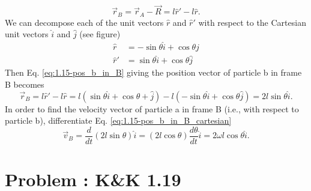 \documentclass[solutions]{esg8012pset}
\begin{document}
\begin{enumerate}[a.]
      \begin{equation} \vec r_B = \vec r_A - \vec R = l\hat r' - l\hat r. \label{eq:1.15-pos_b_in_B} \end{equation}
      We can decompose each of the unit vectors $\hat r$ and $\hat r'$ with respect to the Cartesian unit vectors $\hat i$ and $\hat j$ (see figure)
      \begin{align}
        \hat r & = -\sin\theta \hat i + \cos\theta \hat j \label{eq:1.15-cartesian_r_hat} \\
        \hat r' & = \sin\theta \hat i + \cos\theta \hat j \label{eq:1.15-cartesian_r_hat'}
      \end{align}
      Then Eq. \ref{eq:1.15-pos_b_in_B} giving the position vector of particle b in frame B becomes
      \begin{equation}
        \vec r_B = l\hat r' - l\hat r = l(\sin\theta \hat i + \cos\theta + \hat j) - l(-\sin\theta \hat i + \cos\theta \hat j) = 2l\sin\theta \hat i. \label{eq:1.15-pos_b_in_B_cartesian}
      \end{equation}
      In order to find the velocity vector of particle a in frame B (i.e., with respect to particle b), differentiate Eq. \ref{eq:1.15-pos_b_in_B_cartesian}
      \begin{equation}
        \vec v_B = \frac{d}{dt}(2l\sin\theta) \hat i = (2l\cos\theta)\frac{d\theta}{dt}\hat i = 2\omega l \cos\theta \hat i.
      \end{equation}
  \end{enumerate}
\section{Problem \thesection: K\&K 1.19}
\end{document}
